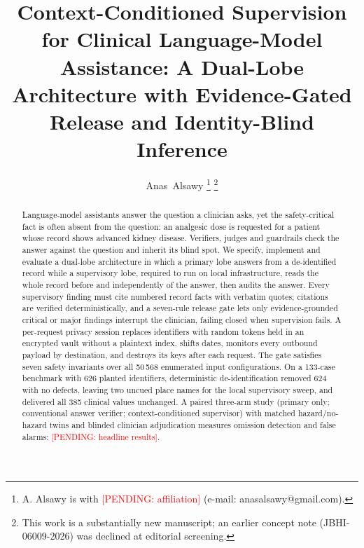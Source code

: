 \documentclass[journal]{IEEEtran}
\newcommand{\pending}[1]{\textcolor{red}{[PENDING: #1]}}
\begin{document}
\title{Context-Conditioned Supervision for Clinical Language-Model Assistance: A Dual-Lobe Architecture with Evidence-Gated Release and Identity-Blind Inference}

\author{Anas~Alsawy%
\thanks{A. Alsawy is with \pending{affiliation} (e-mail: anasalsawy@gmail.com).}%
\thanks{This work is a substantially new manuscript; an earlier concept note (JBHI-06009-2026) was declined at editorial screening.}}


\maketitle

\begin{abstract}
Language-model assistants answer the question a clinician asks, yet the safety-critical fact is often absent from the question: an analgesic dose is requested for a patient whose record shows advanced kidney disease. Verifiers, judges and guardrails check the answer against the question and inherit its blind spot. We specify, implement and evaluate a dual-lobe architecture in which a primary lobe answers from a de-identified record while a supervisory lobe, required to run on local infrastructure, reads the whole record before and independently of the answer, then audits the answer. Every supervisory finding must cite numbered record facts with verbatim quotes; citations are verified deterministically, and a seven-rule release gate lets only evidence-grounded critical or major findings interrupt the clinician, failing closed when supervision fails. A per-request privacy session replaces identifiers with random tokens held in an encrypted vault without a plaintext index, shifts dates, monitors every outbound payload by destination, and destroys its keys after each request. The gate satisfies seven safety invariants over all 50\,568 enumerated input configurations. On a 133-case benchmark with 626 planted identifiers, deterministic de-identification removed 624 with no defects, leaving two uncued place names for the local supervisory sweep, and delivered all 385 clinical values unchanged. A paired three-arm study (primary only; conventional answer verifier; context-conditioned supervisor) with matched hazard/no-hazard twins and blinded clinician adjudication measures omission detection and false alarms: \pending{headline results}.
\end{abstract}
\end{document}
